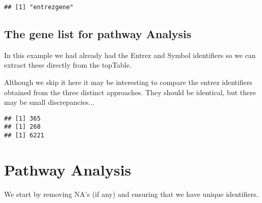 \documentclass{article}\usepackage[]{graphicx}\usepackage[]{color}
\makeatletter
\newenvironment{kframe}{%
 \def\at@end@of@kframe{}%
 \ifinner\ifhmode%
  \def\at@end@of@kframe{\end{minipage}}%
  \begin{minipage}{\columnwidth}%
 \fi\fi%
 \def\FrameCommand##1{\hskip\@totalleftmargin \hskip-\fboxsep
 \colorbox{shadecolor}{##1}\hskip-\fboxsep
     \hskip-\linewidth \hskip-\@totalleftmargin \hskip\columnwidth}%
 \MakeFramed {\advance\hsize-\width
   \@totalleftmargin\z@ \linewidth\hsize
   \@setminipage}}%
 {\par\unskip\endMakeFramed%
 \at@end@of@kframe}
\newenvironment{knitrout}{}{} %
\makeatother
\begin{document}
\begin{knitrout}
\begin{kframe}
{\ttfamily\noindent\bfseries\color{errorcolor}{\#\# Error in `[.data.frame`(filters, u133aDatasets, ): object 'u133aDatasets' not found}}

{\ttfamily\noindent\bfseries\color{errorcolor}{\#\# Error in u133aFilters[3, 1]: incorrect number of dimensions}}

{\ttfamily\noindent\bfseries\color{errorcolor}{\#\# Error in eval(expr, envir, enclos): object 'myu133aFilter' not found}}\begin{verbatim}
## [1] "entrezgene"
\end{verbatim}


{\ttfamily\noindent\bfseries\color{errorcolor}{\#\# Error in getBM(filters = myu133aFilter, attributes = c(myentrezAtribut, : object 'myu133aFilter' not found}}

{\ttfamily\noindent\bfseries\color{errorcolor}{\#\# Error in head(entrezfromProbesUp): object 'entrezfromProbesUp' not found}}\end{kframe}
\end{knitrout}

\subsection{The gene list for pathway Analysis}

In this example we had already had the Entrez and Symbol identifiers so we can extract these directly from the topTable.

Although we skip it here it may be interesting to compare the entrez identifiers obtained from the three distinct approaches. They should be identical, but there may be small discrepancies...

\begin{knitrout}
\color{fgcolor}\begin{kframe}
\begin{verbatim}
## [1] 365
## [1] 268
## [1] 6221
\end{verbatim}
\end{kframe}
\end{knitrout}

\section{Pathway Analysis}

We start by removing NA's (if any) and ensuring that we have unique identifiers.
\end{document}
